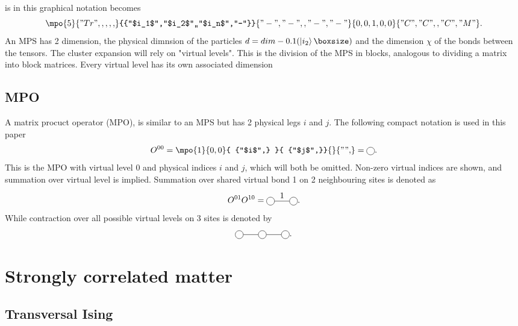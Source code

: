 \documentclass[twocolumn]{article}
\newcounter{a}
\newcounter{b}
\begin{document}
 is in this graphical notation becomes
\begin{equation}\label{eq:general_mps}
    \mpo{5}{{"Tr",,,,,}}{{"$i_1$","$i_2$",,"$i_n$","-"}}{{"-","-",,"-","-"}}{{0,0,1,0,0}}{{"C", "C",,"C","M" }}.
\end{equation}
An MPS has 2 dimension, the physical dimnsion of the particles $d = dim \left( \ket{i_2}  \right)$ and the dimension $\chi$ of the bonds between the tensors. The cluster expansion will rely on "virtual levels". This is the division of the MPS in blocks, analogous to dividing a matrix into block matrices. Every virtual level has its own associated dimension
\subsection{MPO}
A matrix procuct operator (MPO), is similar to an MPS but has 2 physical legs $i$ and $j$. The following compact notation is used in this paper
\begin{equation}
    O^{0 0} = \mpo{1}{ {0,0}  }{ {"$i$",}  }{ {"$j$",}}{}{{"",}} = \mpob{1}{ {0,0}  }{ {"$i$",}  }{ {"$j$",}}{}{{"",}}.
\end{equation}
This is the MPO with virtual level 0 and physical indices $i$ and $j$, which will both be omitted. Non-zero virtual indices are shown, and summation over virtual level is implied. Summation over shared virtual bond 1 on 2 neighbouring sites is denoted as
\begin{equation}
    O^{0 1} O^{1 0} = \mpob{2}{ {0,1,0}  }{ {"$i_1$","$i_2$"}  }{ {"$j_1$","$j_1$",}}{}{{"",}}.
\end{equation}
While contraction over all possible virtual levels on 3 sites is denoted by
\begin{equation} \label{PEPO_3}
    \mpob{3}{ {0,,,0}  }{}{}{}{{"",,}} .
\end{equation}

\section{Strongly correlated matter}

\subsection{Transversal Ising}
\end{document}
